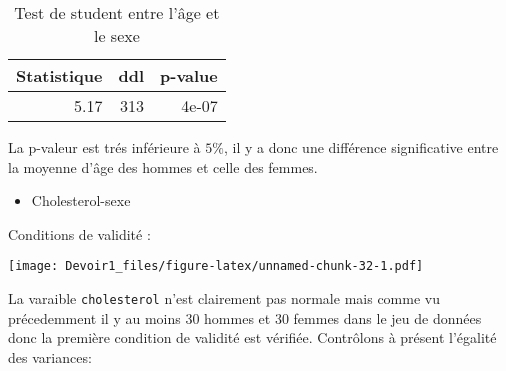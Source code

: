 \documentclass[]{article}
\newenvironment{Shaded}{\begin{snugshade}}{\end{snugshade}}
\newcommand{\KeywordTok}[1]{\textcolor[rgb]{0.13,0.29,0.53}{\textbf{#1}}}
\newcommand{\DataTypeTok}[1]{\textcolor[rgb]{0.13,0.29,0.53}{#1}}
\newcommand{\DecValTok}[1]{\textcolor[rgb]{0.00,0.00,0.81}{#1}}
\newcommand{\StringTok}[1]{\textcolor[rgb]{0.31,0.60,0.02}{#1}}
\newcommand{\ControlFlowTok}[1]{\textcolor[rgb]{0.13,0.29,0.53}{\textbf{#1}}}
\newcommand{\OperatorTok}[1]{\textcolor[rgb]{0.81,0.36,0.00}{\textbf{#1}}}
\newcommand{\NormalTok}[1]{#1}
\providecommand{\tightlist}{%
  \setlength{\itemsep}{0pt}\setlength{\parskip}{0pt}}
\begin{document}
\begin{table}

\caption{\label{tab:unnamed-chunk-31}Test de student entre l'âge et le sexe}
\centering
\begin{tabular}[t]{r|r|r}
\hline
Statistique & ddl & p-value\\
\hline
5.17 & 313 & 4e-07\\
\hline
\end{tabular}
\end{table}

La p-valeur est trés inférieure à \(5 \%\), il y a donc une différence
significative entre la moyenne d'âge des hommes et celle des femmes.

\begin{itemize}
\tightlist
\item
  Cholesterol-sexe
\end{itemize}

Conditions de validité :

\begin{Shaded}
\end{Shaded}

\texttt{[image: Devoir1\_files/figure-latex/unnamed-chunk-32-1.pdf]}

La varaible \texttt{cholesterol} n'est clairement pas normale mais comme
vu précedemment il y au moins 30 hommes et 30 femmes dans le jeu de
données donc la première condition de validité est vérifiée. Contrôlons
à présent l'égalité des variances:

\begin{Shaded}
\end{Shaded}
\end{document}
